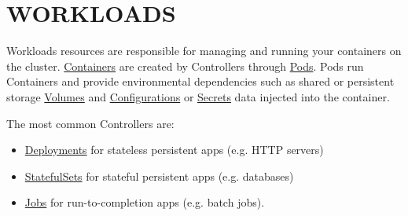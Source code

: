 \section{WORKLOADS}
\label{workloads}

Workloads resources are responsible for managing and running your containers on the cluster.
\href{container-v1-core}{Containers} are created by Controllers through
\href{pod-v1-core}{Pods}.
Pods run Containers and provide environmental dependencies such as shared or
persistent storage \href{volume-v1-core}{Volumes} and
\href{configmap-v1-core}{Configurations} or
\href{secret-v1-core}{Secrets} data injected into the container.

The most common Controllers are:

\begin{itemize}
	\item \href{deployment-v1beta1-apps}{Deployments} for stateless persistent apps (e.g. HTTP servers)
	\item \href{statefulset-v1beta1-apps}{StatefulSets} for stateful persistent apps (e.g. databases)
	\item \href{job-v1-batch}{Jobs} for run-to-completion apps (e.g. batch jobs).
\end{itemize}

